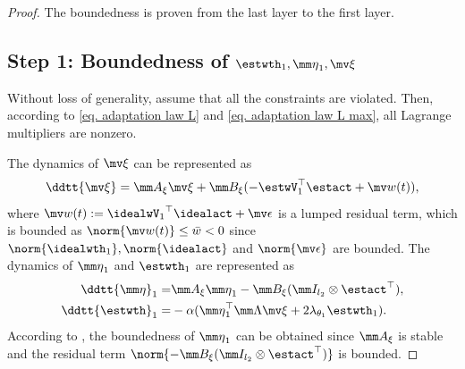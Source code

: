 \documentclass[letterpaper, 10 pt, conference]{ieeeconf}  %
\begin{document}
\begin{proof}
The boundedness is proven from the last layer to the first layer.

\subsection*{Step 1: Boundedness of ${\estwth}_1,{\mm \eta}_1,\mv \xi$}

\color{black}
Without loss of generality, assume that all the constraints are violated. 
Then, according to \eqref{eq. adaptation law L} and \eqref{eq. adaptation law L max}, all Lagrange multipliers are nonzero.
\color{black}

The dynamics of $\mv \xi$ can be represented as
\begin{equation}    
    \ddtt {\mv\xi} = \mm A_\xi\mv \xi +\mm B_\xi
    (
        -\estwV_1^\top \estact+\mv w(t)
    )
    ,
\end{equation}
where $\mv w(t):= {\idealwV_1}^{\top}\idealact+\mv \epsilon$ is a lumped residual term, which is bounded as $\norm{\mv  w(t)}\le \bar w< 0$ since $\norm{\idealwth_1},\norm{\idealact}$ and $\norm{\mv\epsilon}$ are bounded.
The dynamics of ${\mm \eta}_1$ and ${\estwth}_1$ are represented as
\begin{equation}
    \begin{aligned}
        \ddtt{\mm \eta}_1 =
        & 
        \mm A_\xi {\mm \eta}_1 -\mm B_\xi (\mm I_{l_{2}}\otimes \estact^\top )
        ,
        \\
        \ddtt{{\estwth}}_1 =
        & -\alpha 
        (
            {\mm \eta}_1^\top 
            \mm \Lambda
            \mv\xi
            +
            2\lambda_{\theta_1} {\estwth}_1
        )
        .
    \end{aligned} 
\end{equation}
According to \cite[Chap.~4 T.~1.9]{Desoer:2009aa}, the boundedness of ${\mm \eta}_1$ can be obtained since $\mm A_\xi$ is stable and the residual term $\norm{-\mm B_\xi (\mm I_{l_{2}}\otimes \estact^\top )}$ is bounded.


\end{proof}
\end{document}
